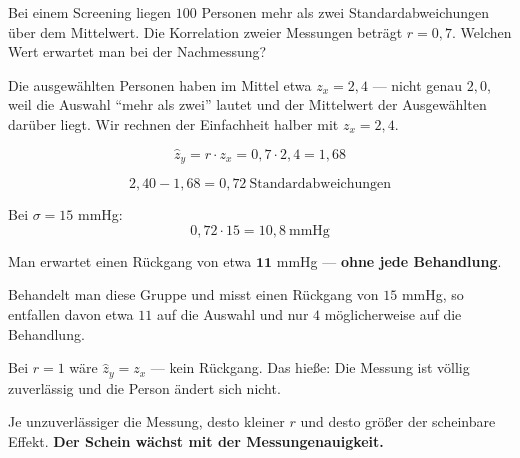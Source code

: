 \begin{aufgabe}
Bei einem Screening liegen $100$ Personen mehr als zwei Standardabweichungen über dem Mittelwert. Die Korrelation zweier Messungen beträgt $r = 0{,}7$. Welchen Wert erwartet man bei der Nachmessung?

\loesung
{}
Die ausgewählten Personen haben im Mittel etwa $z_x = 2{,}4$ --- nicht genau $2{,}0$, weil die Auswahl \enquote{mehr als zwei} lautet und der Mittelwert der Ausgewählten darüber liegt. Wir rechnen der Einfachheit halber mit $z_x = 2{,}4$.

\[ \hat z_y = r \cdot z_x = 0{,}7 \cdot 2{,}4 = 1{,}68 \]

\[ 2{,}40 - 1{,}68 = 0{,}72 \ \text{Standardabweichungen} \]

Bei $\sigma = 15$ mmHg:
\[ 0{,}72 \cdot 15 = 10{,}8 \ \text{mmHg} \]

Man erwartet einen Rückgang von etwa $\mathbf{11}$ mmHg --- \textbf{ohne jede Behandlung}.

Behandelt man diese Gruppe und misst einen Rückgang von $15$ mmHg, so entfallen davon etwa $11$ auf die Auswahl und nur $4$ möglicherweise auf die Behandlung.

\begin{center}
\begin{minipage}{0.88\textwidth}
\end{minipage}
\end{center}

Bei $r = 1$ wäre $\hat z_y = z_x$ --- kein Rückgang. Das hieße: Die Messung ist völlig zuverlässig und die Person ändert sich nicht.

Je unzuverlässiger die Messung, desto kleiner $r$ und desto größer der scheinbare Effekt. \textbf{Der Schein wächst mit der Messungenauigkeit.}
\end{aufgabe}

